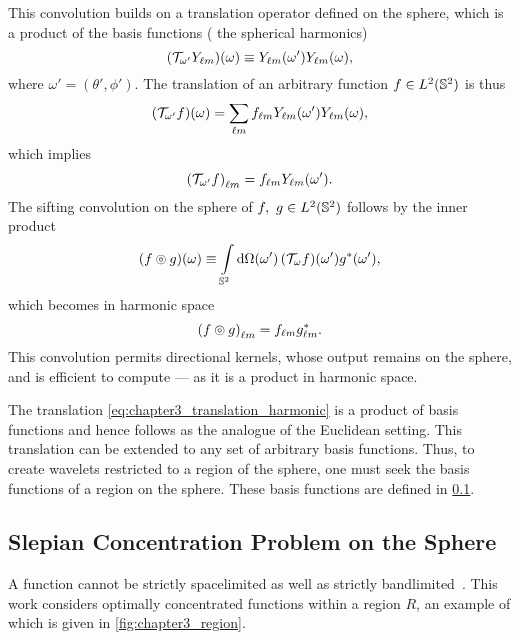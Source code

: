 This convolution builds on a translation operator defined on the sphere, which is a product of the basis functions (\ie{} the spherical harmonics)
%
\begin{equation}\label{eq:chapter3_translation_harmonic}
	\pixel{(\translation{\omega'}\harmonic{Y})}
	\equiv \pixel[']{\harmonic{Y}} \pixel{\harmonic{Y}},
\end{equation}
%
where \(\omega'=(\theta',\phi')\).
The translation of an arbitrary function \(f \in \hilbert{\twoSphere}\) is thus
%
\begin{equation}
	\pixel{(\translation{\omega'}f)}
	= \harmonicSum \harmonic{f} \pixel[']{\harmonic{Y}} \pixel{\harmonic{Y}},
\end{equation}
%
which implies
%
\begin{equation}
	\harmonic{(\translation{\omega'}f)} = \harmonic{f} \pixel[']{\harmonic{Y}}.
\end{equation}
%
The sifting convolution on the sphere of \(f,\ g \in \hilbert{\twoSphere}\) follows by the inner product
%
\begin{equation}\label{eq:chapter3_sifting_convolution}
	\pixel{\convolution{f}{g}}
	\equiv \integrateSphere{\omega'} \pixel[']{(\translation{\omega}f)} \pixel[']{\conj{g}},
\end{equation}
%
which becomes in harmonic space
%
\begin{equation}
	\harmonic{\convolution{f}{g}}
	= \harmonic{f} \conj{\harmonic{g}}.
\end{equation}
%
This convolution permits directional kernels, whose output remains on the sphere, and is efficient to compute --- as it is a product in harmonic space.

The translation \cref{eq:chapter3_translation_harmonic} is a product of basis functions and hence follows as the analogue of the Euclidean setting.
This translation can be extended to any set of arbitrary basis functions.
Thus, to create wavelets restricted to a region of the sphere, one must seek the basis functions of a region on the sphere.
These basis functions are defined in \cref{sec:chapter3_slepian_concentration_problem}.

\subsection{Slepian Concentration Problem on the Sphere}\label{sec:chapter3_slepian_concentration_problem}

A function cannot be strictly spacelimited as well as strictly bandlimited~\cite{Slepian1961,Slepian1983}.
This work considers optimally concentrated functions within a region \(R\), an example of which is given in \cref{fig:chapter3_region}.

